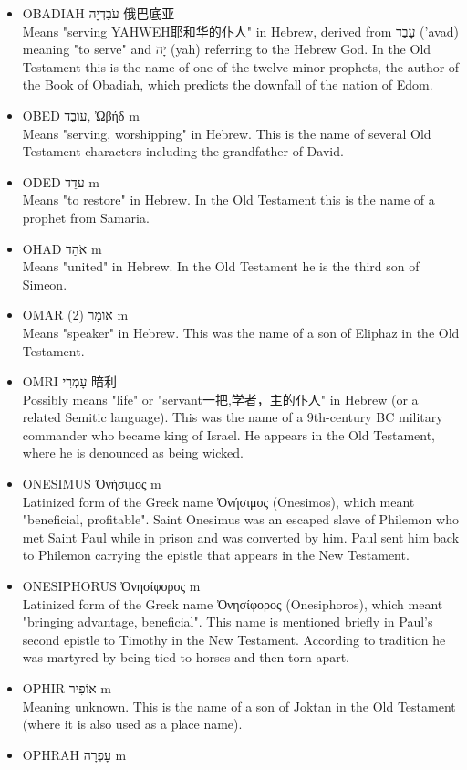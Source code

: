 \begin{itemize}
\item OBADIAH עֹבַדְיָה 俄巴底亚 \\
Means "serving YAHWEH耶和华的仆人" in Hebrew, derived from עָבַד ('avad) meaning "to serve" and יָה (yah) referring to the Hebrew God. In the Old Testament this is the name of one of the twelve minor prophets, the author of the Book of Obadiah, which predicts the downfall of the nation of Edom.
\item OBED עוֹבֵד, Ὠβήδ m \\
Means "serving, worshipping" in Hebrew. This is the name of several Old Testament characters including the grandfather of David.
\item ODED עֹדֵד m \\
Means "to restore" in Hebrew. In the Old Testament this is the name of a prophet from Samaria.
\item OHAD אֹהַד m \\
Means "united" in Hebrew. In the Old Testament he is the third son of Simeon.
\item OMAR (2) אוֹמָר m \\
Means "speaker" in Hebrew. This was the name of a son of Eliphaz in the Old Testament.
\item OMRI עָמְרִי 暗利 \\
Possibly means "life" or "servant一把,学者，主的仆人" in Hebrew (or a related Semitic language). This was the name of a 9th-century BC military commander who became king of Israel. He appears in the Old Testament, where he is denounced as being wicked.
\item ONESIMUS Ὀνήσιμος m \\
Latinized form of the Greek name Ὀνήσιμος (Onesimos), which meant "beneficial, profitable". Saint Onesimus was an escaped slave of Philemon who met Saint Paul while in prison and was converted by him. Paul sent him back to Philemon carrying the epistle that appears in the New Testament.
\item ONESIPHORUS Ὀνησίφορος m \\
Latinized form of the Greek name Ὀνησίφορος (Onesiphoros), which meant "bringing advantage, beneficial". This name is mentioned briefly in Paul's second epistle to Timothy in the New Testament. According to tradition he was martyred by being tied to horses and then torn apart.
\item OPHIR אוֹפִיר m\\
Meaning unknown. This is the name of a son of Joktan in the Old Testament (where it is also used as a place name).
\item OPHRAH עָפְרָה m \\

\end{itemize}
